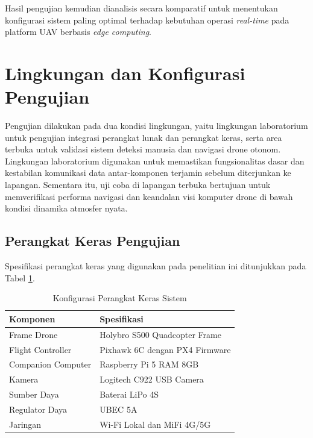 Hasil pengujian kemudian dianalisis secara komparatif untuk menentukan konfigurasi sistem paling optimal terhadap kebutuhan operasi \textit{real-time} pada platform UAV berbasis \textit{edge computing}.

\section{Lingkungan dan Konfigurasi Pengujian}

Pengujian dilakukan pada dua kondisi lingkungan, yaitu lingkungan laboratorium untuk pengujian integrasi perangkat lunak dan perangkat keras, serta area terbuka untuk validasi sistem deteksi manusia dan navigasi drone otonom. Lingkungan laboratorium digunakan untuk memastikan fungsionalitas dasar dan kestabilan komunikasi data antar-komponen terjamin sebelum diterjunkan ke lapangan. Sementara itu, uji coba di lapangan terbuka bertujuan untuk memverifikasi performa navigasi dan keandalan visi komputer drone di bawah kondisi dinamika atmosfer nyata.

\subsection{Perangkat Keras Pengujian}

Spesifikasi perangkat keras yang digunakan pada penelitian ini ditunjukkan pada Tabel \ref{tab:hardware_testing}.

\begin{table}[H]
	\centering
	\caption{Konfigurasi Perangkat Keras Sistem}
	\label{tab:hardware_testing}
	\renewcommand{\arraystretch}{1.2}
	\begin{tabular}{|p{5cm}|p{8cm}|}
		\hline
		Komponen & Spesifikasi \\ \hline
		
		Frame Drone &
		Holybro S500 Quadcopter Frame \\ \hline
		
		Flight Controller &
		Pixhawk 6C dengan PX4 Firmware \\ \hline
		
		Companion Computer &
		Raspberry Pi 5 RAM 8GB \\ \hline
		
		Kamera &
		Logitech C922 USB Camera \\ \hline
		
		Sumber Daya &
		Baterai LiPo 4S \\ \hline
		
		Regulator Daya &
		UBEC 5A \\ \hline
		
		Jaringan &
		Wi-Fi Lokal dan MiFi 4G/5G \\ \hline
	\end{tabular}
\end{table}

